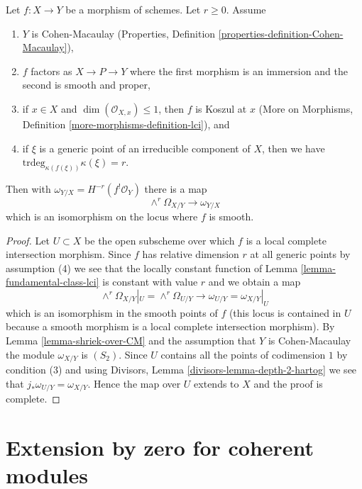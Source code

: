 \begin{lemma}
\label{lemma-fundamental-class-almost-lci}
Let $f : X \to Y$ be a morphism of schemes. Let $r \geq 0$. Assume
\begin{enumerate}
\item $Y$ is Cohen-Macaulay (Properties, Definition
\ref{properties-definition-Cohen-Macaulay}),
\item $f$ factors as $X \to P \to Y$ where the first morphism is
an immersion and the second is smooth and proper,
\item if $x \in X$ and $\dim(\mathcal{O}_{X, x}) \leq 1$,
then $f$ is Koszul at $x$ (More on Morphisms, Definition
\ref{more-morphisms-definition-lci}), and
\item if $\xi$ is a generic point of an irreducible component of $X$, then
we have
$\text{trdeg}_{\kappa(f(\xi))} \kappa(\xi) = r$.
\end{enumerate}
Then with $\omega_{Y/X} = H^{-r}(f^!\mathcal{O}_Y)$ there is a map
$$
\wedge^r\Omega_{X/Y} \longrightarrow \omega_{Y/X}
$$
which is an isomorphism on the locus where $f$ is smooth.
\end{lemma}

\begin{proof}
Let $U \subset X$ be the open subscheme over which $f$ is a
local complete intersection morphism. Since $f$ has relative
dimension $r$ at all generic points by assumption (4) we
see that the locally constant function of
Lemma \ref{lemma-fundamental-class-lci}
is constant with value $r$ and we obtain a map
$$
\wedge^r\Omega_{X/Y}|_U = \wedge^r \Omega_{U/Y}
\longrightarrow
\omega_{U/Y} = \omega_{X/Y}|_U
$$
which is an isomorphism in the smooth points of $f$ (this locus
is contained in $U$ because a smooth morphism is a local complete
intersection morphism). By Lemma \ref{lemma-shriek-over-CM}
and the assumption that $Y$ is Cohen-Macaulay
the module $\omega_{X/Y}$ is $(S_2)$.
Since $U$ contains all the points of codimension $1$ by condition (3)
and using Divisors, Lemma \ref{divisors-lemma-depth-2-hartog}
we see that $j_*\omega_{U/Y} = \omega_{X/Y}$.
Hence the map over $U$ extends to $X$ and the proof
is complete.
\end{proof}






\section{Extension by zero for coherent modules}
\label{section-extension-by-zero}

